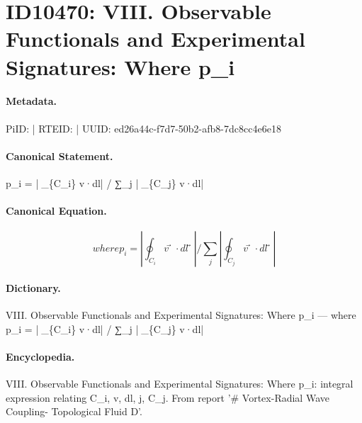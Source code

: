 \section*{ID10470: VIII. Observable Functionals and Experimental Signatures: Where p\_i}
\paragraph{Metadata.}
PiID:  | RTEID:  | UUID: ed26a44c-f7d7-50b2-afb8-7dc8cc4e6e18

\paragraph{Canonical Statement.}
p\_i = |∮\_\{C\_i\} v⃗·dl⃗| / ∑\_j |∮\_\{C\_j\} v⃗·dl⃗|

\paragraph{Canonical Equation.}
\[
where p_i = |∮_{C_i} v⃗·dl⃗| / ∑_j |∮_{C_j} v⃗·dl⃗|
\]

\paragraph{Dictionary.}
VIII. Observable Functionals and Experimental Signatures: Where p\_i — where p\_i = |∮\_\{C\_i\} v⃗·dl⃗| / ∑\_j |∮\_\{C\_j\} v⃗·dl⃗|

\paragraph{Encyclopedia.}
VIII. Observable Functionals and Experimental Signatures: Where p\_i: integral expression relating C\_i, v, dl, j, C\_j. From report '\# Vortex-Radial Wave Coupling- Topological Fluid D'.
